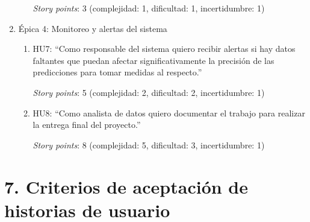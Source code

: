 \documentclass[
11pt, %
]{charter}
\begin{document}
\begin{enumerate}
\begin{enumerate}
		\textit{Story points}: 3 (complejidad: 1, dificultad: 1, incertidumbre: 1)

	\end{enumerate}
	\item Épica 4: Monitoreo y alertas del sistema
	\begin{enumerate}
		\item HU7: “Como responsable del sistema quiero recibir alertas si hay datos faltantes que puedan afectar significativamente la precisión de las predicciones para tomar medidas al respecto.”

		\textit{Story points}: 5 (complejidad: 2, dificultad: 2, incertidumbre: 1)
		
		\item HU8: “Como analista de datos quiero documentar el trabajo para realizar la entrega final del proyecto.”
		
		\textit{Story points}: 8 (complejidad: 5, dificultad: 3, incertidumbre: 1)
		
	\end{enumerate}
\end{enumerate}


\section{7. Criterios de aceptación de historias de usuario}
\label{sec:criteriosAceptacion}
\end{document}
